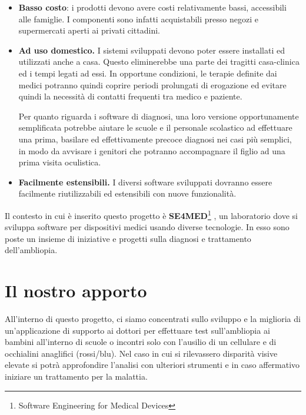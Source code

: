 \documentclass[
	corpo=12pt,
	twoside,
 	evenboxes,
	tipotesi=triennale,
    	stile=classica,
   	 greek,
]{toptesi}
\begin{document}
\begin{itemize}
\item \textbf{Basso costo}: i prodotti devono avere costi relativamente bassi, accessibili alle famiglie.
I componenti sono infatti acquistabili presso negozi e supermercati aperti ai privati cittadini.
\item \textbf{Ad uso domestico.} I sistemi sviluppati devono
poter essere installati ed utilizzati anche a casa. Questo eliminerebbe una parte
dei tragitti casa-clinica ed i tempi legati ad essi. In opportune condizioni, le 
terapie definite dai medici potranno quindi coprire periodi prolungati di erogazione
ed evitare quindi la necessità di contatti frequenti tra medico e paziente.

Per quanto riguarda i software di diagnosi, una loro versione opportunamente semplificata
potrebbe aiutare le scuole e il personale scolastico ad effettuare una prima, basilare
ed effettivamente precoce diagnosi nei casi più semplici, in modo da avvisare i genitori
che potranno accompagnare il figlio ad una prima visita oculistica.
\item \textbf{Facilmente estensibili.} I diversi software sviluppati dovranno essere
facilmente riutilizzabili ed estensibili con nuove funzionalità.
\end{itemize}

Il contesto in cui è inserito questo progetto è \textbf{SE4MED}\footnote{Software Engineering for Medical Devices} \cite{se4med}, un laboratorio dove si sviluppa software per dispositivi medici usando diverse tecnologie. In esso sono poste un insieme di iniziative e progetti sulla diagnosi e trattamento dell'ambliopia.

\section{Il nostro apporto}
\label{sec:ilnostroapporto}
All'interno di questo progetto, ci siamo concentrati sullo sviluppo e la miglioria di un'applicazione di supporto ai dottori per effettuare test sull'ambliopia ai bambini all'interno di scuole o incontri solo con l'ausilio di un cellulare e di occhialini anaglifici (rossi/blu). Nel caso in cui si rilevassero disparità visive elevate si potrà approfondire l'analisi con ulteriori strumenti e in caso affermativo iniziare un trattamento per la malattia.\\
\end{document}
